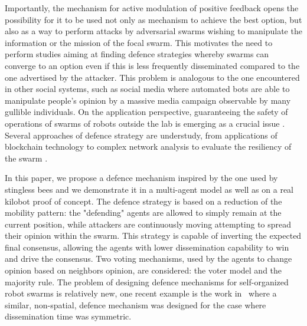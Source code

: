 \documentclass[sigconf]{acmart}
\begin{document}
Importantly, the  mechanism for active modulation of positive feedback opens the possibility for it to be used not only as mechanism to achieve the best option, but also as a way to perform  attacks by adversarial swarms wishing to manipulate the information or the mission of the focal swarm. This motivates the need to perform studies aiming at finding defence strategies whereby swarms can converge to an option even if this is less frequently disseminated compared to the one advertised by the attacker. This problem is analogous to the one encountered in other social systems, such as social media where automated bots are able to manipulate people's opinion by a massive media campaign observable by many gullible individuals\cite{Ferrara2017MeasuringSS}. On the application perspective, guaranteeing the safety of operations of swarms of robots outside the lab is emerging as a crucial issue \cite{Hunt2020, Reina2020, Jones2020}.
Several approaches of defence strategy are understudy, from applications of blockchain technology \cite{Strobel2020_blockchain} to complex network analysis to evaluate the resiliency of the swarm \cite{Liu2020}.



In this paper, we propose a defence mechanism inspired by the one used by
stingless bees %
\cite{Nieh2005,Gastauer2011} and we demonstrate it in a multi-agent model as well as on a real kilobot proof of concept. The defence strategy 
is based on a reduction of the mobility pattern: the "defending" agents  are allowed to simply remain at the current position, while attackers are continuously moving attempting to spread their opinion within the swarm. This strategy is capable of inverting the expected final consensus, allowing the agents with lower dissemination capability to win and drive the consensus.  Two voting mechanisms, used by the agents to change opinion based on neighbors opinion, are considered: the voter model and the majority rule. The problem of designing defence mechanisms for self-organized robot swarms is relatively new, one recent example is the work in~\cite{PrimieroEtAl:2018} where a similar, non-spatial, defence mechanism was designed for the case where dissemination time was symmetric. 
\end{document}
